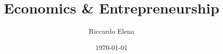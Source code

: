 \documentclass{csnotes}
\title{Economics \& Entrepreneurship}
\author{Riccardo Elena}
\date{\today}
\begin{document}
\maketitlepage{}


\tableofcontents
\newpage
\end{document}
